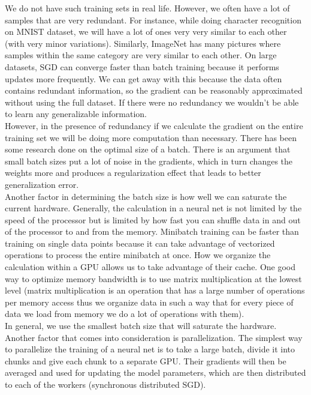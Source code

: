 We do not have such training sets in real life. However, we often have a lot of samples that are very redundant. 
For instance, while doing character recognition on MNIST dataset, we will have a lot of ones very very similar to each other (with very minor variations). 
Similarly, ImageNet has many pictures where samples within the same category are very similar to each other. 
On large datasets, SGD can converge faster than batch training because it performs updates more frequently.
We can get away with this because the data often contains redundant information, so the gradient can be reasonably approximated without using the full dataset. 
If there were no redundancy we wouldn’t be able to learn any generalizable information.\\

However, in the presence of redundancy if we calculate the gradient on the entire training set we will be doing more computation than necessary. 
There has been some research done on the optimal size of a batch. 
There is an argument that small batch sizes put a lot of noise in the gradients, which in turn changes the weights more and produces a  regularization effect that leads to better generalization error.\\

Another factor in determining the batch size is how well we can saturate the current hardware.
Generally, the calculation in a neural net is not limited by the speed of the processor but is limited by how fast you can shuffle data in and out of the processor to and from the memory. 
Minibatch training can be faster than training on single data points because it can take advantage of vectorized operations to process the entire minibatch at once. 
How we organize the calculation within a GPU allows us to take advantage of their cache. 
One good way to optimize memory bandwidth is to use matrix multiplication at the lowest level (matrix multiplication is an operation that has a large number of operations per memory access thus we organize data in such a way that for every piece of data we load from memory we do a lot of operations with them).\\

In general, we use the smallest batch size that will saturate the hardware. 
Another factor that comes into consideration is parallelization. 
The simplest way to parallelize the training of a neural net is to take a large batch,  divide it into chunks and give each chunk to a separate GPU. 
Their gradients will then be averaged and used for updating the model parameters, which are then distributed to each of the workers (synchronous distributed SGD).\\

